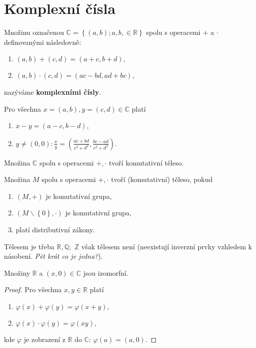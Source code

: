 \section{Komplexní čísla}
\begin{definition}\label{kompl_c_def}
Množinu označenou $\mathbb C = \left \{ (a,b);  a,b, \in \mathbb R \right \} $
spolu s operacemi $+$ a $\cdot$ definovanými následovně:
\begin{enumerate}[$i.$]
\item $(a,b) + (c,d) = (a+c, b+d),$
\item $(a,b) \cdot (c,d) = (ac-bd, ad+bc)$,
\end{enumerate}
nazýváme \textbf{komplexními čísly}.
\end{definition}

\begin{veta}
    Pro všechna $x=(a,b),y=(c,d) \in \mathbb C$ platí
    \begin{enumerate}[$i.$]
    \item $x-y=(a-c, b-d)$,
   	\item $y\ne (0,0): \frac{x}{y}=\left ( \frac{ac+bd}{c^2+d^2}, \frac{bc-ad}{c^2+d^2} \right ) .$
    \end{enumerate}
\end{veta}

\begin{veta}
    Množina $\mathbb C$ spolu s operacemi $+,\cdot$ tvoří komutativní těleso.
\end{veta}

\begin{pozn}\label{teleso}
    Množina $M$ spolu s operacemi $+,\cdot$ tvoří (komutativní) těleso, pokud
    \begin{enumerate}[$i.$]
    \item $(M,+)$ je komutativní grupa,
   	\item $(M\smallsetminus\left \{ 0 \right \} ,\cdot)$ je komutativní grupa,
   	\item platí distributivní zákony.
    \end{enumerate}
    Tělesem je třeba $\mathbb R, \mathbb Q;$ $\mathbb Z$ však tělesem není (neexistují
    inverzní prvky vzhledem k násobení. \textit{Pět krát co je jedna?}).
\end{pozn}

\begin{veta}
    Množiny $\mathbb R$ a $(x,0)\in \mathbb C$ jsou izomorfní.
\end{veta}

\begin{proof}
    Pro všechna $x,y \in \mathbb R$ platí
    \begin{enumerate}[$i.$]
    \item $\varphi(x)+\varphi(y) = \varphi(x+y),$
   	\item $\varphi(x)\cdot\varphi(y) = \varphi(xy),$
    \end{enumerate}
    kde $\varphi$ je zobrazení z $\mathbb R$ do $\mathbb C$: $\varphi(a)=(a,0).$
\end{proof}

